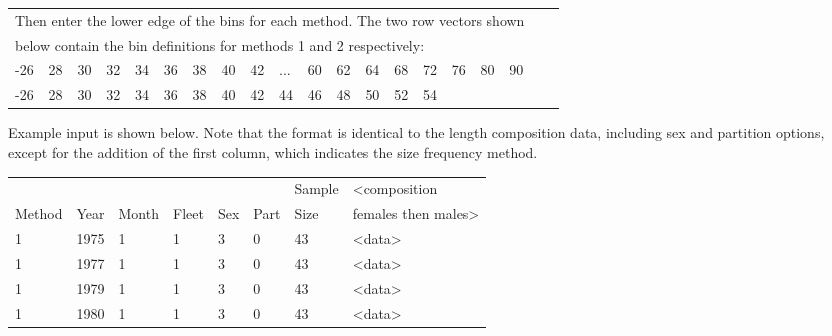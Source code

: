 \begin{center}
	\begin{tabular}{p{0.4cm} p{0.4cm} p{0.4cm} p{0.4cm} p{0.4cm} p{0.4cm} p{0.5cm} p{0.5cm} p{0.5cm} p{0.5cm} p{0.5cm} p{0.5cm} p{0.5cm} p{0.5cm} p{0.5cm} p{0.5cm} p{0.5cm} p{0.5cm} p{0.5cm} p{0.25cm}}
		\multicolumn{18}{l}{Then enter the lower edge of the bins for each method. The two row vectors shown} \\
		\multicolumn{18}{l}{below contain the bin definitions for methods 1 and 2 respectively:} \\
		\hline
		-26 & 28 & 30 & 32 & 34 & 36 & 38 & 40 & 42 & ... & 60 & 62 & 64 & 68 & 72 & 76 & 80 & 90 \Tstrut\\
		-26 & 28 & 30 & 32 & 34 & 36 & 38 & 40 & 42 &  44 & 46 & 48 & 50 & 52 & \multicolumn{4}{l}{54} \Bstrut\\
		\hline 
	\end{tabular}
	\leavevmode\tagmcend\tagstructend\par
\end{center}

Example input is shown below. Note that the format is identical to the length composition data, including sex and partition options, except for the addition of the first column, which indicates the size frequency method.

\begin{center}
	\begin{tabular}{p{1.5cm} p{1cm} p{1cm} p{1cm} p{1cm} p{1cm} p{1.5cm} p{5cm}}
		\hline
		& & & & & & Sample & <composition \Tstrut\\
		Method & Year & Month & Fleet & Sex & Part & Size & females then males> \Bstrut\\
		\hline
		1 & 1975 & 1 & 1 & 3 & 0 & 43 & <data> \Tstrut\\
		1 & 1977 & 1 & 1 & 3 & 0 & 43 & <data> \\
		1 & 1979 & 1 & 1 & 3 & 0 & 43 & <data> \\
		1 & 1980 & 1 & 1 & 3 & 0 & 43 & <data> \Bstrut\\
		\hline
	\end{tabular}
	\leavevmode\tagmcend\tagstructend\par
\end{center}

